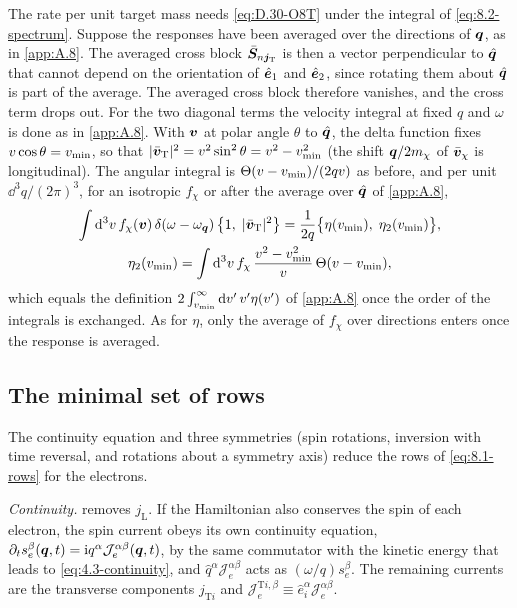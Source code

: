 The rate per unit target mass needs \cref{eq:D.30-O8T} under the integral of \cref{eq:8.2-spectrum}. Suppose the responses have been averaged over the directions of $\bm{q}$, as in \cref{app:A.8}. The averaged cross block $\bar{\bm{S}}_{n\bm{j}_{\mathrm{T}}}$ is then a vector perpendicular to $\hat{\bm{q}}$ that cannot depend on the orientation of $\hat{\bm{e}}_1$ and $\hat{\bm{e}}_2$, since rotating them about $\hat{\bm{q}}$ is part of the average. The averaged cross block therefore vanishes, and the cross term drops out. For the two diagonal terms the velocity integral at fixed $q$ and $\omega$ is done as in \cref{app:A.8}. With $\bm{v}$ at polar angle $\theta$ to $\hat{\bm{q}}$, the delta function fixes $v\cos\theta = v_{\mathrm{min}}$, so that $|\bar{\bm{v}}_{\mathrm{T}}|^2 = v^2\sin^2\theta = v^2 - v_{\mathrm{min}}^2$ (the shift $\bm{q}/2m_{\chi}$ of $\bar{\bm{v}}_\chi$ is longitudinal). The angular integral is $\Theta(v - v_{\mathrm{min}})/(2qv)$ as before, and per unit $\dd^3q/(2\pi)^3$, for an isotropic $f_\chi$ or after the average over $\hat{\bm{q}}$ of \cref{app:A.8},
\begin{equation}
  \begin{gathered}
  \int\mathrm{d}^3v\,f_\chi(\bm{v})\,\delta(\omega - \omega_{\bm{q}})\,\bigl\{1,\;|\bar{\bm{v}}_{\mathrm{T}}|^2\bigr\} = \frac{1}{2q}\bigl\{\eta(v_{\mathrm{min}}),\;\eta_2(v_{\mathrm{min}})\bigr\} ,
  \\
  \eta_2(v_{\mathrm{min}}) = \int\mathrm{d}^3v\,f_\chi\,\frac{v^2 - v_{\mathrm{min}}^2}{v}\,\Theta(v - v_{\mathrm{min}}) ,
  \end{gathered}
  \label{eq:D.30-kernel}
\end{equation}
which equals the definition $2\int_{v_{\mathrm{min}}}^\infty\mathrm{d} v'\,v'\eta(v')$ of \cref{app:A.8} once the order of the integrals is exchanged. As for $\eta$, only the average of $f_\chi$ over directions enters once the response is averaged.

\subsection{The minimal set of rows}

The continuity equation and three symmetries (spin rotations, inversion with time reversal, and rotations about a symmetry axis) reduce the rows of \cref{eq:8.1-rows} for the electrons.

\emph{Continuity.}  removes $j_{\mathrm{L}}$. If the Hamiltonian also conserves the spin of each electron, the spin current obeys its own continuity equation, $\partial_ts^\beta_e(\bm{q},t) = \mathrm{i} q^\alpha\mathcal{J}^{\alpha\beta}_e(\bm{q},t)$, by the same commutator with the kinetic energy that leads to \cref{eq:4.3-continuity}, and $\hat q^\alpha\mathcal{J}^{\alpha\beta}_e$ acts as $(\omega/q)s^\beta_e$. The remaining currents are the transverse components $j_{\mathrm{T}i}$ and $\mathcal{J}^{\mathrm{T}i,\beta}_e \equiv \hat e^\alpha_i\mathcal{J}^{\alpha\beta}_e$.

